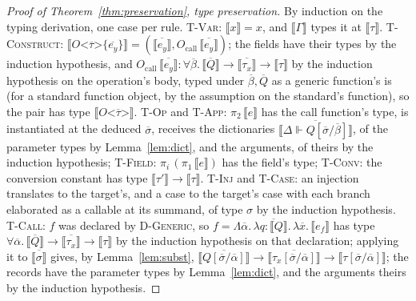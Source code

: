 \begin{proof}[Proof of Theorem~\ref{thm:preservation}, type preservation]
By induction on the typing derivation, one case per rule.
\textsc{T-Var}: $\llbracket x \rrbracket = x$, and $\llbracket \Gamma \rrbracket$ types it at $\llbracket \tau \rrbracket$.
\textsc{T-Construct}: $\llbracket O\texttt{<}\overline{\tau}\texttt{>\{}\overline{e_y}\texttt{\}} \rrbracket = (\overline{\llbracket e_y \rrbracket}, O_{\mathrm{call}}\,\overline{\llbracket e_y \rrbracket})$; the fields have their types by the induction hypothesis, and $O_{\mathrm{call}}\,\overline{\llbracket e_y \rrbracket} : \forall\overline{\beta}.\,\overline{\llbracket Q \rrbracket} \to \overline{\llbracket \tau_x \rrbracket} \to \llbracket \tau \rrbracket$ by the induction hypothesis on the operation's body, typed under $\overline{\beta}, \overline{Q}$ as a generic function's is (for a standard function object, by the assumption on the standard's function), so the pair has type $\llbracket O\texttt{<}\overline{\tau}\texttt{>} \rrbracket$.
\textsc{T-Op} and \textsc{T-App}: $\pi_2\,\llbracket e \rrbracket$ has the call function's type, is instantiated at the deduced $\overline{\sigma}$, receives the dictionaries $\overline{\llbracket \Delta \Vdash Q[\overline{\sigma}/\overline{\beta}] \rrbracket}$, of the parameter types by Lemma~\ref{lem:dict}, and the arguments, of theirs by the induction hypothesis; \textsc{T-Field}: $\pi_i\,(\pi_1\,\llbracket e \rrbracket)$ has the field's type; \textsc{T-Conv}: the conversion constant has type $\llbracket \tau' \rrbracket \to \llbracket \tau \rrbracket$.
\textsc{T-Inj} and \textsc{T-Case}: an injection translates to the target's, and a case to the target's case with each branch elaborated as a callable at its summand, of type $\sigma$ by the induction hypothesis.
\textsc{T-Call}: $f$ was declared by \textsc{D-Generic}, so $f = \Lambda\overline{\alpha}.\,\lambda\overline{q : \llbracket Q \rrbracket}.\,\lambda\overline{x}.\,\llbracket e_f \rrbracket$ has type $\forall\overline{\alpha}.\,\overline{\llbracket Q \rrbracket} \to \overline{\llbracket \tau_x \rrbracket} \to \llbracket \tau \rrbracket$ by the induction hypothesis on that declaration; applying it to $\overline{\llbracket \sigma \rrbracket}$ gives, by Lemma~\ref{lem:subst}, $\overline{\llbracket Q[\overline{\sigma}/\overline{\alpha}] \rrbracket} \to \overline{\llbracket \tau_x[\overline{\sigma}/\overline{\alpha}] \rrbracket} \to \llbracket \tau[\overline{\sigma}/\overline{\alpha}] \rrbracket$; the records have the parameter types by Lemma~\ref{lem:dict}, and the arguments theirs by the induction hypothesis.

\end{proof}
